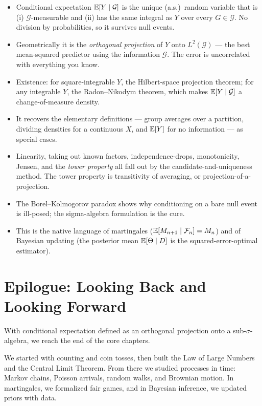 \begin{recoverybox}
\begin{itemize}
  \item Conditional expectation $\operatorname{\mathbb{E}}[Y\mid\mathcal{G}]$ is the unique (a.s.)\ random variable that is
    (i) $\mathcal{G}$-measurable and (ii) has the same integral as $Y$ over every $G \in \mathcal{G}$.
    No division by probabilities, so it survives null events.
  \item Geometrically it is the \emph{orthogonal projection} of $Y$ onto $L^2(\mathcal{G})$ --- the
    best mean-squared predictor using the information $\mathcal{G}$. The error is uncorrelated with
    everything you know.
  \item Existence: for square-integrable $Y$, the Hilbert-space projection theorem; for any integrable
    $Y$, the Radon--Nikodym theorem, which makes $\operatorname{\mathbb{E}}[Y\mid\mathcal{G}]$ a change-of-measure density.
  \item It recovers the elementary definitions --- group averages over a partition, dividing densities
    for a continuous $X$, and $\operatorname{\mathbb{E}}[Y]$ for no information --- as special cases.
  \item Linearity, taking out known factors, independence-drops, monotonicity, Jensen, and the
    \emph{tower property} all fall out by the candidate-and-uniqueness method. The tower property is
    transitivity of averaging, or projection-of-a-projection.
  \item The Borel--Kolmogorov paradox shows why conditioning on a bare null event is ill-posed; the
    sigma-algebra formulation is the cure.
  \item This is the native language of martingales ($\operatorname{\mathbb{E}}[M_{n+1}\mid\mathcal{F}_n] = M_n$) and of
    Bayesian updating (the posterior mean $\operatorname{\mathbb{E}}[\Theta\mid D]$ is the squared-error-optimal estimator).
\end{itemize}
\end{recoverybox}

\section{Epilogue: Looking Back and Looking Forward}
\label{ch38:epilogue}

With conditional expectation defined as an orthogonal projection onto a
sub-$\sigma$-algebra, we reach the end of the core chapters.

We started with counting and coin tosses, then built the Law of Large Numbers
and the Central Limit Theorem. From there we studied processes in time:
Markov chains, Poisson arrivals, random walks, and Brownian motion. In martingales,
we formalized fair games, and in Bayesian inference, we updated priors with data.

